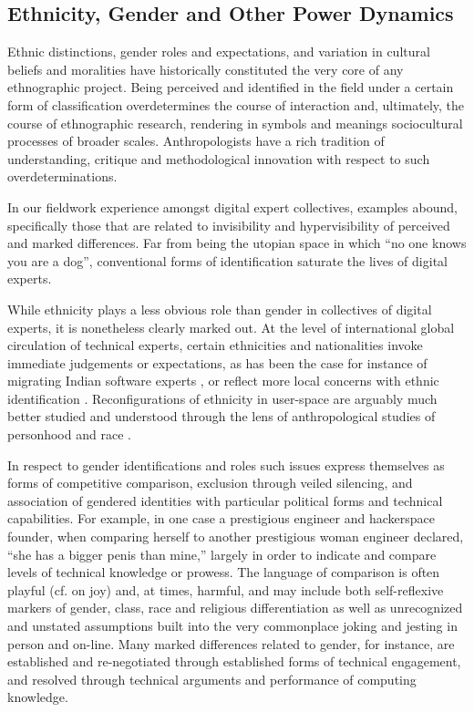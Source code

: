 \documentclass[10pt,letter,oneside]{scrartcl}
\begin{document}
\subsection*{Ethnicity, Gender and Other Power Dynamics}

Ethnic distinctions, gender roles and expectations, and variation in
cultural beliefs and moralities have historically constituted the very
core of any ethnographic project. Being perceived and identified in
the field under a certain form of classification overdetermines the
course of interaction and, ultimately, the course of ethnographic
research, rendering in symbols and meanings sociocultural processes of
broader scales. Anthropologists have a rich tradition of
understanding, critique and methodological innovation with respect to
such overdeterminations. 

In our fieldwork experience amongst digital expert collectives,
examples abound, specifically those that are related to invisibility
and hypervisibility of perceived and marked differences.  Far from
being the utopian space in which ``no one knows you are a dog'',
conventional forms of identification saturate the lives of digital
experts.  

While ethnicity plays a less obvious role than gender in collectives
of digital experts, it is nonetheless clearly marked out.  At the
level of international global circulation of technical experts,
certain ethnicities and nationalities invoke immediate judgements or
expectations, as has been the case for instance of migrating Indian software
experts \cite{xiang2007}, or reflect more local concerns with ethnic
identification \cite{Takhteyev2012,Burrell,Chan}.  Reconfigurations of
ethnicity in user-space are arguably much better studied and
understood through the lens of anthropological studies of personhood
and race \cite{BOELLSTORFF2008,Miller,Nakamura}.

In respect to gender identifications and roles such issues
express themselves as forms of competitive comparison, exclusion
through veiled silencing, and association of gendered identities with
particular political forms and technical capabilities.  For example,
in one case a prestigious engineer and hackerspace founder, when
comparing herself to another prestigious woman engineer declared,
``she has a bigger penis than mine,'' largely in order to indicate and
compare levels of technical knowledge or prowess.  The language of
comparison is often playful (cf. \cite{Coleman2012} on joy) and, at
times, harmful, and may include both self-reflexive markers of gender,
class, race and religious differentiation as well as unrecognized and
unstated assumptions built into the very commonplace joking and
jesting in person and on-line.  Many marked differences related to
gender, for instance, are established and re-negotiated through
established forms of technical engagement, and resolved through
technical arguments and performance of computing knowledge.
\end{document}
